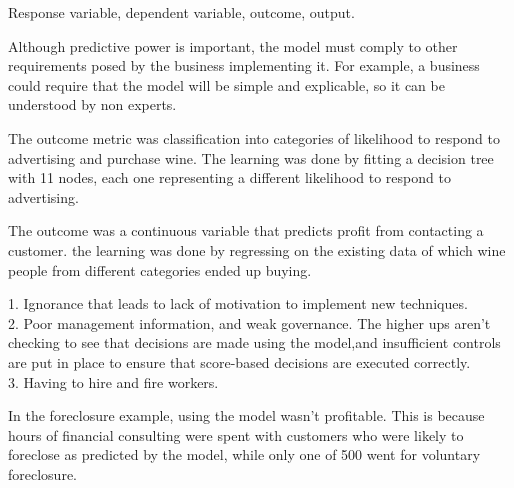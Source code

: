 \documentclass[12pt]{article}
\begin{document}
\begin{enumerate}


Response variable, dependent variable, outcome, output. 


Although predictive power is important, the model must comply to other requirements posed by the business implementing it. For example, a business could require that the model will be simple and explicable, so it can be understood by non experts. 



The outcome metric was classification into categories of likelihood to respond to advertising and purchase wine. The learning was done by fitting a decision tree with 11 nodes, each one representing a different likelihood to respond to advertising. 


The outcome was a continuous variable that predicts profit from contacting a customer. the learning was done by regressing on the existing data of which wine people from different categories ended up buying. 



1. Ignorance that leads to lack of motivation to implement new techniques. \\
2. Poor management information, and weak governance. The higher ups aren't checking to see that decisions are made using the model,and insufficient controls are put in place to ensure that score-based decisions are executed correctly. \\
3. Having to hire and fire workers. 



In the foreclosure example, using the model wasn't profitable. This is because hours of financial consulting were spent with customers who were likely to foreclose as predicted by the model, while only one of 500 went for voluntary foreclosure.   


\end{enumerate}
\end{document}
